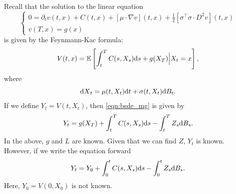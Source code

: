 \documentclass[11pt]{book}
\newcommand{\dd}{\text{\normalfont d}}
\newcommand{\dt}{\text{\normalfont d}t}
\newcommand{\ds}{\text{\normalfont d}s}
\newcommand{\dX}{\text{\normalfont d}X}
\begin{document}
\begin{eg}
Recall that
the solution to the linear equation 
\begin{equation}
\begin{cases}
		0 =\partial_{t}v(t,x)+C(t,x)+[\mu \cdot\nabla v](t,x)+\frac12[\sigma^\intercal\sigma \cdot D^2v](t,x)\\
v(T,x)=g(x)
\end{cases}		
\end{equation}
is given by the Feynmann-Kac formula:
\begin{equation}
V(t,x)=\mathbb{E}\left[\int_t^T C(s,X_s){{\ds}}+g(X_T)\Big| X_t=x\right],
\end{equation}
where
\begin{equation}
{\dX}_t=\mu(t,X_t){{\dt}}+\sigma(t,X_t){\dd}B_t.
\end{equation}
If we define $Y_t=V(t,X_t)$, then \eqref{eqn:bsde_mg} is given by 
\begin{equation}
Y_t=g(X_T)+\int_t^T C(s,X_s){{\ds}}-\int_t^TZ_s{\dd}B_s.
\end{equation}
In the above, $g$ and $L$ are known. Given that we can find $Z$, $Y_t$ is known. However, if we write the equation forward
\begin{equation}
Y_t=Y_0+\int_0^t C(s,X_s){{\ds}}-\int_0^tZ_s{\dd}B_s.
\end{equation}
Here, $Y_0=V(0,X_0)$ is not known. 
\end{eg}
\end{document}
